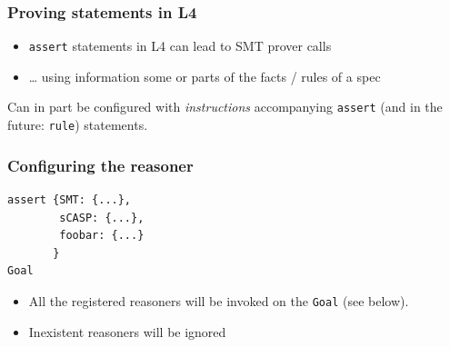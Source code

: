 \documentclass{beamer}
\begin{document}
\begin{frame}[fragile]\frametitle{Proving statements in L4}

  \begin{itemize}
  \item \texttt{assert} statements in L4 can lead to SMT prover calls
  \item \dots{} using information some or parts of the facts / rules of a spec
  \end{itemize}


  \vspace{5mm}
  \vspace{5mm}
  
  Can in part be configured with \emph{instructions} accompanying
  \texttt{assert} (and in the future: \texttt{rule}) statements.

\end{frame}


\begin{frame}[fragile]\frametitle{Configuring the reasoner}

\begin{verbatim}
assert {SMT: {...},
        sCASP: {...},
        foobar: {...}
       }
Goal
\end{verbatim}

  \begin{itemize}
  \item All the registered reasoners will be invoked on the \texttt{Goal}
    (see below).
  \item Inexistent reasoners will be ignored
  \end{itemize}

\end{frame}
\end{document}
